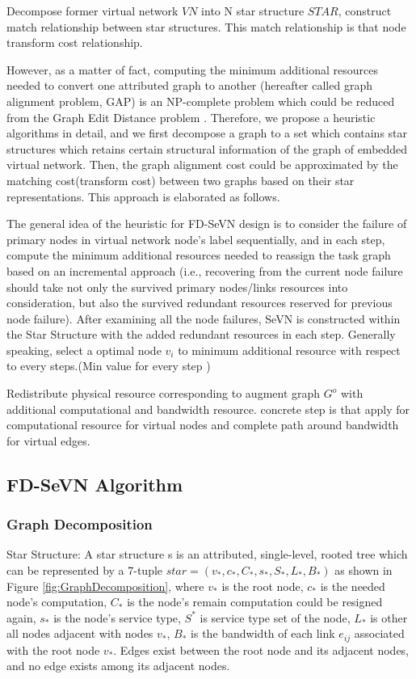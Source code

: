 Decompose former virtual network $VN$ into N star structure $STAR$, construct match relationship between star structures. This match relationship is that node transform cost relationship.

However, as a matter of fact, computing the minimum additional resources needed to convert one attributed graph to another (hereafter called graph alignment problem, GAP) is an NP-complete problem which could be reduced from the Graph Edit Distance problem \cite{justice2006binary}. Therefore, we propose a heuristic algorithms in detail, and we first decompose a graph to a set which contains star structures which retains certain structural information of the graph of embedded virtual network. Then, the graph alignment cost could be approximated by the matching cost(transform cost) between two graphs based on their star representations. This approach is elaborated as follows.


The general idea of the heuristic for FD-SeVN design is to consider the failure of primary nodes in virtual network node's label sequentially, and in each step, compute the minimum additional resources needed to reassign the task graph based on an incremental approach (i.e., recovering from the current node failure should take not only the survived primary nodes/links resources into consideration, but also the survived redundant resources reserved for previous node failure). After examining all the node failures, SeVN is constructed within the Star Structure with the added redundant resources in each step. Generally speaking, select a optimal node $v_i$ to minimum additional resource with respect to every steps.(Min value for every step )



Redistribute physical resource corresponding to augment graph $G^o$  with additional computational and bandwidth resource. concrete step is that apply for computational resource for virtual nodes and complete path around bandwidth for virtual edges.

\subsection{FD-SeVN Algorithm}
\subsubsection{Graph Decomposition}
Star Structure: A star structure s is an attributed, single-level, rooted tree which can be represented by a 7-tuple $star=(v_*,c_*,C_*,s_*,S_*,L_*,B_*)$ as shown in Figure \ref{fig:GraphDecomposition}, where $v_*$ is the root node, $c_*$ is the needed node's computation, $C_*$ is the node's remain computation could be resigned again, $s_*$ is the node's service type, $S^*$ is service type set of the node, $L_*$ is other all nodes  adjacent with nodes $v_*$, $B_*$ is the bandwidth of each link $e_{ij}$ associated with the root node $v_*$. Edges exist between the root node and its adjacent nodes, and no edge exists among its adjacent nodes.

